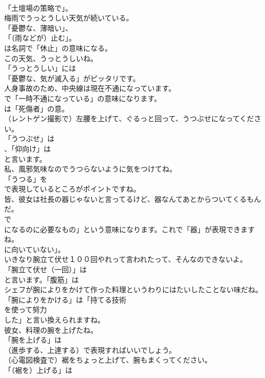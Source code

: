 \documentclass[8pt]{extreport}
\begin{document}
\begin{CJK}{UTF8}{min}
\\	「土壇場の策略で」。	
\\	梅雨でうっとうしい天気が続いている。 
\\	「憂鬱な、薄暗い」、
\\	「（雨などが）止む」。 
\\	は名詞で「休止」の意味になる。	
\\	この天気、うっとうしいね。 
\\	「うっとうしい」には
\\	「憂鬱な、気が滅入る」がピッタリです。	
\\	人身事故のため、中央線は現在不通になっています。 
\\	で「一時不通になっている」の意味になります。
\\	は「死傷者」の意。	
\\	（レントゲン撮影で）左腰を上げて、ぐるっと回って、うつぶせになってください。 
\\	「うつぶせ」は
\\	、「仰向け」は
\\	と言います。	
\\	私、風邪気味なのでうつらないように気をつけてね。 
\\	「うつる」を
\\	で表現しているところがポイントですね。	
\\	皆、彼女は社長の器じゃないと言ってるけど、器なんてあとからついてくるもんだ。 
\\	で
\\	になるのに必要なもの」という意味になります。これで「器」が表現できますね。
\\	に向いていない」。	
\\	いきなり腕立て伏せ１００回やれって言われたって、そんなのできないよ。 
\\	「腕立て伏せ（一回）」は
\\	と言います。「腹筋」は
\\	シェフが腕によりをかけて作った料理というわりにはたいしたことない味だね。 
\\	「腕によりをかける」は「持てる技術
\\	を使って努力 
\\	した」と言い換えられますね。	
\\	彼女、料理の腕を上げたね。 
\\	「腕を上げる」は
\\	（進歩する、上達する）で表現すればいいでしょう。	
\\	（心電図検査で）裾をちょっと上げて、腕もまくってください。 
\\	「（裾を）上げる」は

\end{CJK}
\end{document}
